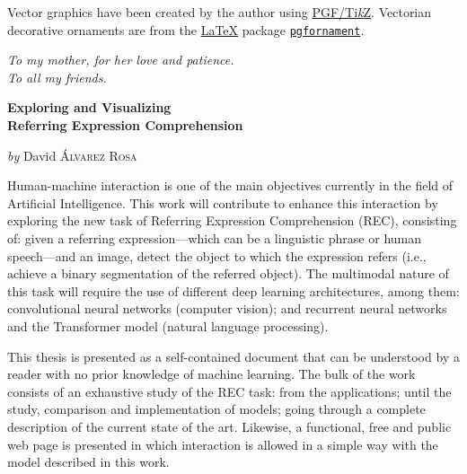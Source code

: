 Vector graphics have been created by the author using
\href{https://www.ctan.org/pkg/pgf}{PGF/Ti\emph{k}Z}. Vectorian decorative
ornaments are from the \href{https://www.latex-project.org//}{\LaTeX} package
\href{https://ctan.org/pkg/pgfornament}{\texttt{pgfornament}}.


\doclicenseThis{}
\normalsize



\cleardoublepage{}
\thispagestyle{empty}
\begin{flushright}
  \itshape
  To my mother, for her love and patience. \\
  To all my friends.
\end{flushright}



\cleardoublepage{}
\thispagestyle{plain}
\null\vfill

\begin{center}
  \Large
  \textbf{Exploring and Visualizing\\
    Referring Expression Comprehension}

  \vspace{2ex}
  \large
  \textit{by} David \textsc{Álvarez Rosa}

  \vspace{3ex}
  \textbf{\abstractname}
\end{center}

\vspace{-2ex}
\noindent Human-machine interaction is one of the main objectives currently in
the field of Artificial Intelligence. This work will contribute to enhance this
interaction by exploring the new task of Referring Expression Comprehension
(REC), consisting of: given a referring expression---which can be a linguistic
phrase or human speech---and an image, detect the object to which the
expression refers (i.e., achieve a binary segmentation of the referred
object). The multimodal nature of this task will require the use of different
deep learning architectures, among them: convolutional neural networks
(computer vision); and recurrent neural networks and the Transformer model
(natural language processing).

This thesis is presented as a self-contained document that can be understood by
a reader with no prior knowledge of machine learning. The bulk of the work
consists of an exhaustive study of the REC task: from the applications; until
the study, comparison and implementation of models; going through a complete
description of the current state of the art. Likewise, a functional, free and
public web page is presented in which interaction is allowed in a simple way
with the model described in this work.

